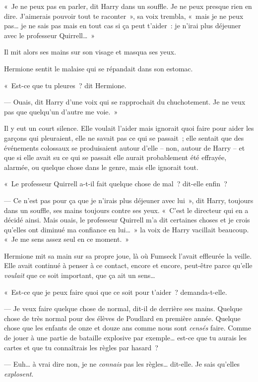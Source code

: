 «~Je ne peux pas en parler, dit Harry dans un souffle.
Je ne peux presque rien en dire.
J'aimerais pouvoir tout te raconter~», sa voix trembla, «~mais je ne peux pas… je ne sais pas mais en tout cas si ça peut t'aider~: je n'irai plus déjeuner avec le professeur Quirrell…~»

Il mit alors ses mains sur son visage et masqua ses yeux.

Hermione sentit le malaise qui se répandait dans son estomac.

«~Est-ce que tu pleures~? dit Hermione.

--- Ouais, dit Harry d'une voix qui se rapprochait du chuchotement.
Je ne veux pas que quelqu'un d'autre me voie.~»

Il y eut un court silence.
Elle voulait l'aider mais ignorait quoi faire pour aider les garçons qui pleuraient, elle ne savait pas ce qui se passait~; elle sentait que des événements colossaux se produisaient autour d'elle -- non, autour de Harry -- et que si elle avait su ce qui se passait elle aurait probablement été effrayée, alarmée, ou quelque chose dans le genre, mais elle ignorait tout.

«~Le professeur Quirrell a-t-il fait quelque chose de mal~? dit-elle enfin~?

--- Ce n'est pas pour ça que je n'irais plus déjeuner avec lui~», dit Harry, toujours dans un souffle, ses mains toujours contre ses yeux.
«~C'est le directeur qui en a décidé ainsi.
Mais ouais, le professeur Quirrell m'a dit certaines choses et je crois qu'elles ont diminué ma confiance en lui…~»
la voix de Harry vacillait beaucoup.
«~Je me sens assez seul en ce moment.~»

Hermione mit sa main sur sa propre joue, là où Fumseck l'avait effleurée la veille.
Elle avait continué à penser à ce contact, encore et encore, peut-être parce qu'elle \emph{voulait} que ce soit important, que ça ait un sens…

«~Est-ce que je peux faire quoi que ce soit pour t'aider~? demanda-t-elle.

--- Je veux faire quelque chose de normal, dit-il de derrière ses mains.
Quelque chose de très normal pour des élèves de Poudlard en première année.
Quelque chose que les enfants de onze et douze ans comme nous sont \emph{censés} faire.
Comme de jouer à une partie de bataille explosive par exemple… est-ce que tu aurais les cartes et que tu connaîtrais les règles par hasard~?

--- Euh… à vrai dire non, je ne \emph{connais} pas les règles… dit-elle.
Je sais qu'elles \emph{explosent}.

